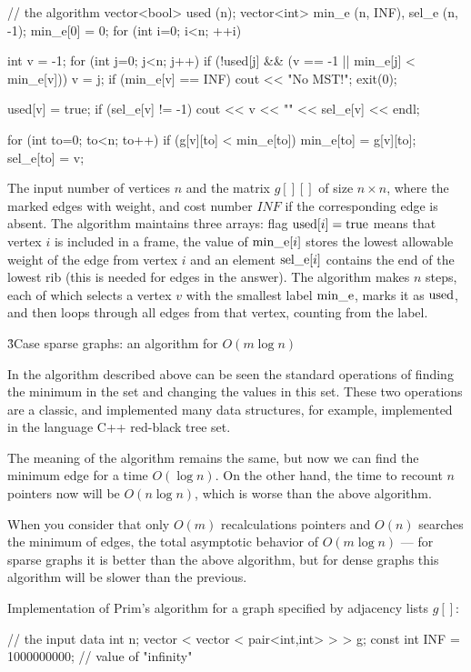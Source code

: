 // the algorithm
vector<bool> used (n);
vector<int> min_e (n, INF), sel_e (n, -1);
min_e[0] = 0;
for (int i=0; i<n; ++i) {
int v = -1;
for (int j=0; j<n; j++)
if (!used[j] && (v == -1 || min_e[j] < min_e[v]))
v = j;
if (min_e[v] == INF) {
cout << "No MST!";
exit(0);
}

used[v] = true;
if (sel_e[v] != -1)
cout << v << "" << sel_e[v] << endl;

for (int to=0; to<n; to++)
if (g[v][to] < min_e[to]) {
min_e[to] = g[v][to];
sel_e[to] = v;
}
}
\endcode

The input number of vertices $n$ and the matrix $g[][]$ of size $n \times n$, where the marked edges with weight, and cost number $INF$ if the corresponding edge is absent. The algorithm maintains three arrays: flag ${\rm used}[i] = {\rm true}$ means that vertex $i$ is included in a frame, the value of ${\rm min\_e}[i]$ stores the lowest allowable weight of the edge from vertex $i$ and an element ${\rm sel\_e}[i]$ contains the end of the lowest rib (this is needed for edges in the answer). The algorithm makes $n$ steps, each of which selects a vertex $v$ with the smallest label ${\rm min\_e}$, marks it as $\rm used$, and then loops through all edges from that vertex, counting from the label.


\h3{Case sparse graphs: an algorithm for $O(m \log n)$}

In the algorithm described above can be seen the standard operations of finding the minimum in the set and changing the values in this set. These two operations are a classic, and implemented many data structures, for example, implemented in the language C++ red-black tree set.

The meaning of the algorithm remains the same, but now we can find the minimum edge for a time $O(\log n)$. On the other hand, the time to recount $n$ pointers now will be $O(n \log n)$, which is worse than the above algorithm.

When you consider that only $O(m)$ recalculations pointers and $O(n)$ searches the minimum of edges, the total asymptotic behavior of $O(m \log n)$ --- for sparse graphs it is better than the above algorithm, but for dense graphs this algorithm will be slower than the previous.

Implementation of Prim's algorithm for a graph specified by adjacency lists $g[]$:

\code
// the input data
int n;
vector < vector < pair<int,int> > > g;
const int INF = 1000000000; // value of "infinity"

